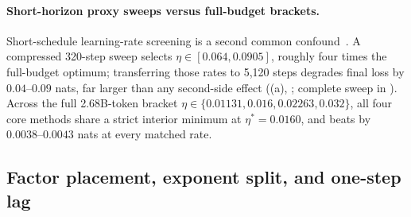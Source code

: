 

\paragraph{Short-horizon proxy sweeps versus full-budget brackets.}
Short-schedule learning-rate screening is a second common confound~\citep{choi2019empirical,schmidt2021crowded,kaddour2023nodata,dang2026batchsize}. A compressed 320-step sweep selects $\eta\in[0.064,0.0905]$, roughly four times the full-budget optimum; transferring those rates to 5,120 steps degrades final loss by $0.04\text{--}0.09$ nats, far larger than any second-side effect ((a), ; complete sweep in ). Across the full 2.68B-token bracket $\eta\in\{0.01131,0.016,0.02263,0.032\}$, all four core methods share a strict interior minimum at $\eta^*=0.0160$, and  beats  by $0.0038\text{--}0.0043$ nats at every matched rate.

\subsection{Factor placement, exponent split, and one-step lag}
\label{sec:ablations}

